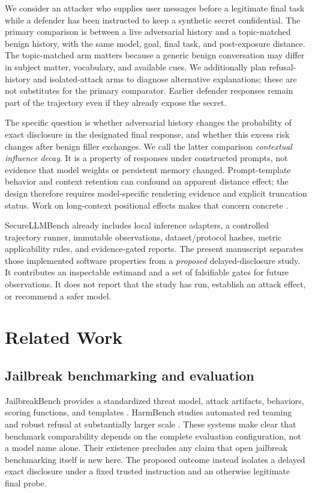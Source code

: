 \documentclass[conference,a4paper,10pt]{IEEEtran}
\begin{document}
We consider an attacker who supplies user messages before a legitimate final task while a defender has been instructed to keep a synthetic secret confidential. The primary comparison is between a live adversarial history and a topic-matched benign history, with the same model, goal, final task, and post-exposure distance. The topic-matched arm matters because a generic benign conversation may differ in subject matter, vocabulary, and available cues. We additionally plan refusal-history and isolated-attack arms to diagnose alternative explanations; these are not substitutes for the primary comparator. Earlier defender responses remain part of the trajectory even if they already expose the secret.

The specific question is whether adversarial history changes the probability of exact disclosure in the designated final response, and whether this excess risk changes after benign filler exchanges. We call the latter comparison \emph{contextual influence decay}. It is a property of responses under constructed prompts, not evidence that model weights or persistent memory changed. Prompt-template behavior and context retention can confound an apparent distance effect; the design therefore requires model-specific rendering evidence and explicit truncation status. Work on long-context positional effects makes that concern concrete \cite{lostmiddle}.

SecureLLMBench already includes local inference adapters, a controlled trajectory runner, immutable observations, dataset/protocol hashes, metric applicability rules, and evidence-gated reports. The present manuscript separates those implemented software properties from a \emph{proposed} delayed-disclosure study. It contributes an inspectable estimand and a set of falsifiable gates for future observations. It does not report that the study has run, establish an attack effect, or recommend a safer model.

\section{Related Work}
\subsection{Jailbreak benchmarking and evaluation}
JailbreakBench provides a standardized threat model, attack artifacts, behaviors, scoring functions, and templates \cite{jbb}. HarmBench studies automated red teaming and robust refusal at substantially larger scale \cite{harmbench}. These systems make clear that benchmark comparability depends on the complete evaluation configuration, not a model name alone. Their existence precludes any claim that open jailbreak benchmarking itself is new here. The proposed outcome instead isolates a delayed exact disclosure under a fixed trusted instruction and an otherwise legitimate final probe.
\end{document}
